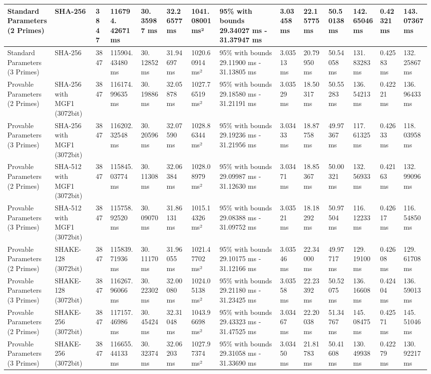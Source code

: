 \documentclass[]{final_report}
\theoremstyle{definition}
\begin{document}
\begin{landscape}
\begin{longtable}{|p{2.3cm}|p{1.8cm}|p{1.0cm}|p{1.7cm}|p{1.2cm}|p{1.5cm}|p{1.8cm}|p{1.5cm}|p{1.2cm}|p{1.5cm}|p{1.3cm}|p{1.2cm}|p{1.3cm}|p{1.3cm}|}
\hline
\endlastfoot
Standard Parameters (2 Primes) & SHA-256 & 3847 & 116794.
42671 ms & 30.
35987 ms & 32.26577 ms & 1041.08001 ms² & 95\% with bounds 29.34027 ms - 31.37947 ms & 3.03458 ms & 22.15775 ms & 50.50138 ms & 142.
65046 ms & 0.42321 ms & 143.
07367 ms \\
\hline
Standard Parameters (3 Primes) & SHA-256 & 3847 & 115904.
43480 ms & 30.
12852 ms & 31.94697 ms & 1020.60914 ms² & 95\% with bounds 29.11900 ms - 31.13805 ms & 3.03513 ms & 20.79950 ms & 50.54058 ms & 131.
83283 ms & 0.42583 ms & 132.
25867 ms \\
\hline
Provable Parameters (2 Primes) & SHA-256 with MGF1 (3072bit) & 3847 & 116174.
99635 ms & 30.
19886 ms & 32.05878 ms & 1027.76519 ms² & 95\% with bounds 29.18580 ms - 31.21191 ms & 3.03529 ms & 18.50317 ms & 50.55283 ms & 136.
54213 ms & 0.42221 ms & 136.
96433 ms \\
\hline
Provable Parameters (3 Primes) & SHA-256 with MGF1 (3072bit) & 3847 & 116202.
32548 ms & 30.
20596 ms & 32.07590 ms & 1028.86344 ms² & 95\% with bounds 29.19236 ms - 31.21956 ms & 3.03433 ms & 18.87758 ms & 49.97367 ms & 117.
61325 ms & 0.42633 ms & 118.
03958 ms \\
\hline
Provable Parameters (2 Primes) & SHA-512 with MGF1 (3072bit) & 3847 & 115845.
03774 ms & 30.
11308 ms & 32.06384 ms & 1028.08979 ms² & 95\% with bounds 29.09987 ms - 31.12630 ms & 3.03471 ms & 18.85367 ms & 50.00321 ms & 132.
56933 ms & 0.42163 ms & 132.
99096 ms \\
\hline
Provable Parameters (3 Primes) & SHA-512 with MGF1 (3072bit) & 3847 & 115758.
92520 ms & 30.
09070 ms & 31.86131 ms & 1015.14326 ms² & 95\% with bounds 29.08388 ms - 31.09752 ms & 3.03521 ms & 18.18292 ms & 50.97504 ms & 116.
12233 ms & 0.42617 ms & 116.
54850 ms \\
\hline
Provable Parameters (2 Primes) & SHAKE-128 (3072bit) & 3847 & 115839.
71936 ms & 30.
11170 ms & 31.96055 ms & 1021.47702 ms² & 95\% with bounds 29.10175 ms - 31.12166 ms & 3.03546 ms & 22.34000 ms & 49.97717 ms & 129.
19100 ms & 0.42608 ms & 129.
61708 ms \\
\hline
Provable Parameters (3 Primes) & SHAKE-128 (3072bit) & 3847 & 116267.
96066 ms & 30.
22302 ms & 32.00080 ms & 1024.05138 ms² & 95\% with bounds 29.21180 ms - 31.23425 ms & 3.03558 ms & 22.23392 ms & 50.52075 ms & 136.
16608 ms & 0.42404 ms & 136.
59013 ms \\
\hline
Provable Parameters (2 Primes) & SHAKE-256 (3072bit) & 3847 & 117157.
46986 ms & 30.
45424 ms & 32.31048 ms & 1043.96698 ms² & 95\% with bounds 29.43323 ms - 31.47525 ms & 3.03467 ms & 22.20038 ms & 51.34767 ms & 145.
08475 ms & 0.42571 ms & 145.
51046 ms \\
\hline
Provable Parameters (3 Primes) & SHAKE-256 (3072bit) & 3847 & 116655.
44133 ms & 30.
32374 ms & 32.06203 ms & 1027.97374 ms² & 95\% with bounds 29.31058 ms - 31.33690 ms & 3.03450 ms & 21.81783 ms & 50.41608 ms & 130.
49938 ms & 0.42279 ms & 130.
92217 ms \\
\hline



\end{longtable}
\end{landscape}
\end{document}
